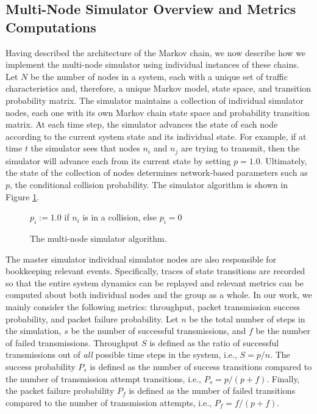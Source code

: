 \documentclass[conference]{IEEEtran}
\begin{document}
\subsection{Multi-Node Simulator Overview and Metrics Computations}

Having described the architecture of the Markov chain, we now describe how we implement the multi-node simulator using individual instances of these chains. Let $N$ be the number of nodes in a system, each with a unique set of traffic characteristics and, therefore, a unique Markov model, state space, and transition probability matrix. The simulator maintains a collection of individual simulator nodes, each one with its own Markov chain state space and probability transition matrix. At each time step, the simulator advances the state of each node according to the current system state and its individual state. For example, if at time $t$ the simulator sees that nodes $n_i$ and $n_j$ are trying to transmit, then the simulator will advance each from its current state by setting $p = 1.0$. Ultimately, the state of the collection of nodes determines network-based parameters such as $p$, the conditional collision probability. The simulator algorithm is shown in Figure \ref{alg:simulator}. 

\begin{figure}
\begin{algorithmic}
		\STATE $p_i := 1.0$ if $n_i$ is in a collision, else $p_i = 0$
	\ENDFOR
\ENDFOR
\end{algorithmic}
\caption{The multi-node simulator algorithm.}
\label{alg:simulator}
\end{figure}

The master simulator individual simulator nodes are also responsible for bookkeeping relevant events. Specifically, traces of state transitions are recorded so that the entire system dynamics can be replayed and relevant metrics can be computed about both individual nodes and the group as a whole. In our work, we mainly consider the following metrics: throughput, packet transmission success probability, and packet failure probability. Let $n$ be the total number of steps in the simulation, $s$ be the number of successful transmissions, and $f$ be the number of failed transmissions. Throughput $S$ is defined as the ratio of successful transmissions out of \emph{all} possible time steps in the system, i.e., $S = p / n$. The success probability $P_s$ is defined as the number of success transitions compared to the number of transmission attempt transitions, i.e., $P_s = p / (p + f)$. Finally, the packet failure probability $P_f$ is defined as the number of failed transitions compared to the number of transmission attempts, i.e., $P_f = f / (p + f)$. 
\end{document}
